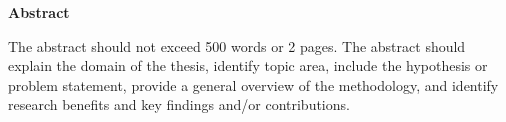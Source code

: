 
\begin{center}\textbf{Abstract}\end{center}

The abstract should not exceed 500 words or 2 pages. The abstract should explain the domain of the thesis, identify topic area, include the hypothesis or problem statement, provide a general overview of the methodology, and identify research benefits and key findings and/or contributions.



\cleardoublepage
